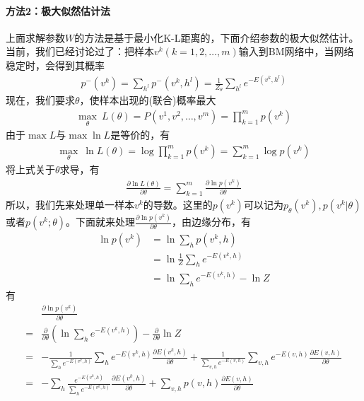 {            \paragraph{方法2：极大似然估计法} 上面求解参数$W$的方法是基于最小化K-L距离的，下面介绍参数的极大似然估计。当前，我们已经讨论过了：把样本$v^k(k=1,2,\dots,m)$输入到BM网络中，当网络稳定时，会得到其概率
            \begin{align*}
            p^-(v^k) = \sum_{h^l}p^-(v^k,h^l) = \frac{1}{Z_\theta} \sum_{h^l}e^{-E(v^k,h^l)}
            \end{align*}
            现在，我们要求$\theta$，使样本出现的(联合)概率最大
            \begin{align*}
            \max_\theta\ L(\theta) = P(v^1,v^2,\dots,v^m) = \prod_{k=1}^mp(v^k)
            \end{align*}
            由于$\max L$与$\max \ln L$是等价的，有
            \begin{align*}
            \max_\theta \ \ln L(\theta)=\log\prod_{k=1}^mp(v^k) = \sum_{k=1}^m\log p(v^k)
            \end{align*}
            将上式关于$\theta$求导，有
            \begin{align*}
            \frac{\partial \ln L(\theta)}{\partial \theta} = \sum_{k=1}^m \frac{\partial \ln p(v^k)}{\partial \theta}
            \end{align*}
            所以，我们先来处理单一样本$v^k$的导数。这里的$p(v^k)$可以记为$p_\theta(v^k),p(v^k|\theta)$或者$p(v^k;\theta)$。下面就来处理$\frac{\partial \ln p(v^k)}{\partial \theta}$，由边缘分布，有
            \begin{align*}
            \ln p(v^k) & = \ln \sum_h p(v^k,h)\\
            & =\ln \frac{1}{Z} \sum_h e^{-E(v^k,h)}\\
            & =\ln \sum_he^{-E(v^k,h)} -\ln Z
            \end{align*}
            有
            \begin{align*}
            &\frac{\partial \ln p(v^k)}{\partial \theta}\\
            ={}& \frac{\partial }{\partial \theta} \left( \ln \sum_he^{-E(v^k,h)} \right)  - \frac{\partial }{\partial \theta} \ln Z\\
            ={}&-\frac{1}{\sum_he^{-E(v^k,h)}}\sum_he^{-E(v^k,h)}\frac{\partial E(v^k,h)}{\partial \theta} + \frac{1}{\sum_{v,h} e^{-E(v,h)}}\sum_{v,h} e^{-E(v,h)}\frac{\partial E(v,h)}{\partial \theta}\\
            ={}&-\sum_h\frac{e^{-E(v^k,h)}}{\sum_he^{-E(v^k,h)}}\frac{\partial E(v^k,h)}{\partial \theta} + \sum_{v,h}p(v,h)\frac{\partial E(v,h)}{\partial \theta}\\

\end{align*}}
